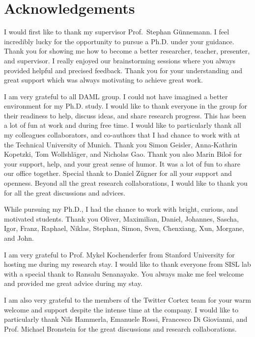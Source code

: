 \chapter*{Acknowledgements}
%



I would first like to thank my supervisor Prof.~Stephan Günnemann. I feel incredibly lucky for the opportunity to pursue a Ph.D. under your guidance. Thank you for showing me how to become a better researcher, teacher, presenter, and supervisor. I really enjoyed our brainstorming sessions where you always provided helpful and precised feedback. Thank you for your understanding and great support which was always motivating to achieve great work.

I am very grateful to all DAML group. I could not have imagined a better environment for my Ph.D. study. I would like to thank everyone in the group for their readiness to help, discuss ideas, and share research progress. This has been a lot of fun at work and during free time. I would like to particularly thank all my colleagues collaborators, and co-authors that I had chance to work with at the Technical University of Munich. Thank you Simon Geisler, Anna-Kathrin Kopetzki, Tom Wollshläger, and Nicholas Gao. Thank you also Marin Biloš for your support, help, and your great sense of humor. It was a lot of fun to share our office together. Special thank to Daniel Zügner for all your support and openness. Beyond all the great research collaborations, I would like to thank you for all the great discussions and advices.

While pursuing my Ph.D., I had the chance to work with bright, curious, and motivated students. Thank you Oliver, Maximilian, Daniel, Johannes, Sascha, Igor, Franz, Raphael, Niklas, Stephan, Simon, Sven, Chenxiang, Xun, Morgane, and John.

I am very grateful to Prof. Mykel Kochenderfer from Stanford University for hosting me during my research stay. I would like to thank everyone from SISL lab with a special thank to Ransalu Senanayake. You always make me feel welcome and provided me great advice during my stay.

I am also very grateful to the members of the Twitter Cortex team for your warm welcome and support despite the intense time at the company. I would like to particularly thank Nils Hammerla, Emanuele Rossi, Francesco Di Giovianni, and Prof. Michael Bronstein for the great discussions and research collaborations.

